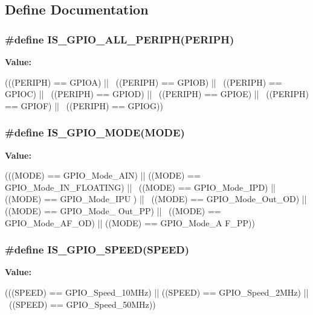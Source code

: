 \subsection{Define Documentation}
\hypertarget{group__GPIO__Exported__Types_ga68b2a1f0b05c13978217db5439c7f790}{
\subsubsection[{IS\_\-GPIO\_\-ALL\_\-PERIPH}]{\setlength{\rightskip}{0pt plus 5cm}\#define IS\_\-GPIO\_\-ALL\_\-PERIPH(PERIPH)}}
\label{group__GPIO__Exported__Types_ga68b2a1f0b05c13978217db5439c7f790}
{\bfseries Value:}
\begin{DoxyCode}
(((PERIPH) == GPIOA) || \
                                    ((PERIPH) == GPIOB) || \
                                    ((PERIPH) == GPIOC) || \
                                    ((PERIPH) == GPIOD) || \
                                    ((PERIPH) == GPIOE) || \
                                    ((PERIPH) == GPIOF) || \
                                    ((PERIPH) == GPIOG))
\end{DoxyCode}
\hypertarget{group__GPIO__Exported__Types_gacc5fde3eef57ec3c558c11d0011d900c}{
\subsubsection[{IS\_\-GPIO\_\-MODE}]{\setlength{\rightskip}{0pt plus 5cm}\#define IS\_\-GPIO\_\-MODE(MODE)}}
\label{group__GPIO__Exported__Types_gacc5fde3eef57ec3c558c11d0011d900c}
{\bfseries Value:}
\begin{DoxyCode}
(((MODE) == GPIO_Mode_AIN) || ((MODE) == GPIO_Mode_IN_FLOATING) || \
                            ((MODE) == GPIO_Mode_IPD) || ((MODE) == GPIO_Mode_IPU
      ) || \
                            ((MODE) == GPIO_Mode_Out_OD) || ((MODE) == GPIO_Mode_
      Out_PP) || \
                            ((MODE) == GPIO_Mode_AF_OD) || ((MODE) == GPIO_Mode_A
      F_PP))
\end{DoxyCode}
\hypertarget{group__GPIO__Exported__Types_ga888e1f951df2fe9dbf827528051a3a56}{
\subsubsection[{IS\_\-GPIO\_\-SPEED}]{\setlength{\rightskip}{0pt plus 5cm}\#define IS\_\-GPIO\_\-SPEED(SPEED)}}
\label{group__GPIO__Exported__Types_ga888e1f951df2fe9dbf827528051a3a56}
{\bfseries Value:}
\begin{DoxyCode}
(((SPEED) == GPIO_Speed_10MHz) || ((SPEED) == GPIO_Speed_2MHz) || \
                              ((SPEED) == GPIO_Speed_50MHz))
\end{DoxyCode}
